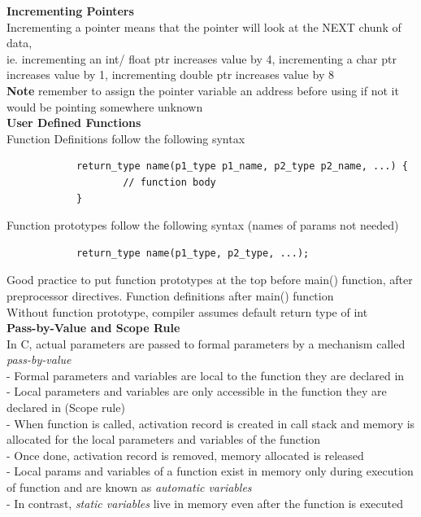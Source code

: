 \documentclass[10pt, a4paper]{article}
\newcommand{\highlight}[1]{{\color{red}\textbf{#1}}}
\begin{document}
\begin{multicols*}{3}
		\textbf{Incrementing Pointers}\\
		Incrementing a pointer means that the pointer will look at the NEXT chunk of data,\\
		ie. incrementing an int/ float ptr increases value by 4, incrementing a char ptr increases value by 1, incrementing double ptr increases value by 8\\
		
		\highlight{Note} remember to assign the pointer variable an address before using if not it would be pointing somewhere unknown\\
		
		\textbf{User Defined Functions}\\
		Function Definitions follow the following syntax
		\begin{verbatim}
			return_type name(p1_type p1_name, p2_type p2_name, ...) {
				    // function body
			}
		\end{verbatim}
		Function prototypes follow the following syntax (names of params not needed)
		\begin{verbatim}
			return_type name(p1_type, p2_type, ...);
		\end{verbatim}
		Good practice to put function prototypes at the top before main() function, after preprocessor directives. Function definitions after main() function\\
		
		Without function prototype, compiler assumes default return type of int\\
		
		\textbf{Pass-by-Value and Scope Rule}\\
		In C, actual parameters are passed to formal parameters by a mechanism called \textit{pass-by-value}\\		
		- Formal parameters and variables are local to the function they are declared in\\
		- Local parameters and variables are only accessible in the function they are declared in (Scope rule)\\
		- When function is called, activation record is created in call stack and memory is allocated for the local parameters and variables of the function\\
		- Once done, activation record is removed, memory allocated is released\\
		- Local params and variables of a function exist in memory only during execution of function and are known as \textit{automatic variables}\\
		- In contrast, \textit{static variables} live in memory even after the function is executed\\
		

\end{multicols*}
\end{document}
